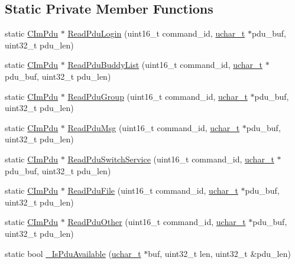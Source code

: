 \subsection*{Static Private Member Functions}
\begin{DoxyCompactItemize}
\item 
static \hyperlink{class_c_im_pdu}{C\+Im\+Pdu} $\ast$ \hyperlink{class_c_im_pdu_aef3a5076bdbce306725806348ecba934}{Read\+Pdu\+Login} (uint16\+\_\+t command\+\_\+id, \hyperlink{base_2ostype_8h_a124ea0f8f4a23a0a286b5582137f0b8d}{uchar\+\_\+t} $\ast$pdu\+\_\+buf, uint32\+\_\+t pdu\+\_\+len)
\item 
static \hyperlink{class_c_im_pdu}{C\+Im\+Pdu} $\ast$ \hyperlink{class_c_im_pdu_a6545ac6770f8e33e65de52944e50924c}{Read\+Pdu\+Buddy\+List} (uint16\+\_\+t command\+\_\+id, \hyperlink{base_2ostype_8h_a124ea0f8f4a23a0a286b5582137f0b8d}{uchar\+\_\+t} $\ast$pdu\+\_\+buf, uint32\+\_\+t pdu\+\_\+len)
\item 
static \hyperlink{class_c_im_pdu}{C\+Im\+Pdu} $\ast$ \hyperlink{class_c_im_pdu_af844b34019ced1398d02783330586848}{Read\+Pdu\+Group} (uint16\+\_\+t command\+\_\+id, \hyperlink{base_2ostype_8h_a124ea0f8f4a23a0a286b5582137f0b8d}{uchar\+\_\+t} $\ast$pdu\+\_\+buf, uint32\+\_\+t pdu\+\_\+len)
\item 
static \hyperlink{class_c_im_pdu}{C\+Im\+Pdu} $\ast$ \hyperlink{class_c_im_pdu_a5c700d29643cb437db477d5eff71da18}{Read\+Pdu\+Msg} (uint16\+\_\+t command\+\_\+id, \hyperlink{base_2ostype_8h_a124ea0f8f4a23a0a286b5582137f0b8d}{uchar\+\_\+t} $\ast$pdu\+\_\+buf, uint32\+\_\+t pdu\+\_\+len)
\item 
static \hyperlink{class_c_im_pdu}{C\+Im\+Pdu} $\ast$ \hyperlink{class_c_im_pdu_a8d649765713ed9de3a8bbc6b98aaaabb}{Read\+Pdu\+Switch\+Service} (uint16\+\_\+t command\+\_\+id, \hyperlink{base_2ostype_8h_a124ea0f8f4a23a0a286b5582137f0b8d}{uchar\+\_\+t} $\ast$pdu\+\_\+buf, uint32\+\_\+t pdu\+\_\+len)
\item 
static \hyperlink{class_c_im_pdu}{C\+Im\+Pdu} $\ast$ \hyperlink{class_c_im_pdu_a10e3591fd8cae9d53606dd91e9102207}{Read\+Pdu\+File} (uint16\+\_\+t command\+\_\+id, \hyperlink{base_2ostype_8h_a124ea0f8f4a23a0a286b5582137f0b8d}{uchar\+\_\+t} $\ast$pdu\+\_\+buf, uint32\+\_\+t pdu\+\_\+len)
\item 
static \hyperlink{class_c_im_pdu}{C\+Im\+Pdu} $\ast$ \hyperlink{class_c_im_pdu_add9975c41d061fedc4d7cccefc84486c}{Read\+Pdu\+Other} (uint16\+\_\+t command\+\_\+id, \hyperlink{base_2ostype_8h_a124ea0f8f4a23a0a286b5582137f0b8d}{uchar\+\_\+t} $\ast$pdu\+\_\+buf, uint32\+\_\+t pdu\+\_\+len)
\item 
static bool \hyperlink{class_c_im_pdu_afcaf47338ef965d20f45096b5e920d27}{\+\_\+\+Is\+Pdu\+Available} (\hyperlink{base_2ostype_8h_a124ea0f8f4a23a0a286b5582137f0b8d}{uchar\+\_\+t} $\ast$buf, uint32\+\_\+t len, uint32\+\_\+t \&pdu\+\_\+len)
\end{DoxyCompactItemize}


